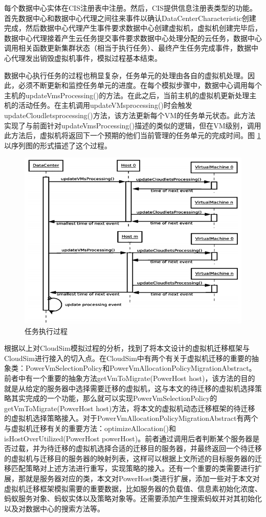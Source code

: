 每个数据中心实体在CIS注册表中注册。然后，CIS提供信息注册表类型的功能。首先数据中心和数据中心代理之间往来事件以确认DataCenterCharacteristic创建完成，然后数据中心代理产生事件要求数据中心创建虚拟机，虚拟机创建完毕后，数据中心代理接着产生云任务提交事件要求数据中心处理分配的云任务，数据中心调用相关函数更新集群状态（相当于执行任务）、最终产生任务完成事件，数据中心代理发出销毁虚拟机事件，模拟过程基本结束。

数据中心执行任务的过程也稍显复杂，任务单元的处理由各自的虚拟机处理。因此，必须不断更新和监控任务单元的进度。在每个模拟步骤中，数据中心调用每个主机的updateVmsProcessing()的方法。在此之后，当前主机的虚拟机更新处理主机的活动任务。在主机调用updateVMsprocessing()时会触发updateCloudletsprocessing()方法，该方法更新每个VM的任务单元状态。此方法实现了与前面针对updateVmsProcessing()描述的类似的逻辑，但在VM级别，调用此方法后，虚拟机将返回下一个预期的他们当前管理的任务单元的完成时间。图 \ref{Fig:chap4_3} 以序列图的形式描述了这个过程。

\begin{figure}[htb]
  \centering
  \includegraphics{./Figure/IMG_Chap4_3.png}
  \caption{任务执行过程}\label{Fig:chap4_3}
\end{figure}

根据以上对CloudSim模拟过程的分析，找到了将本文设计的虚拟机迁移框架与CloudSim进行接入的切入点。在CloudSim中有两个有关于虚拟机迁移的重要的抽象类：PowerVmSelectionPolicy和PowerVmAllocationPolicyMigrationAbstract。前者中有一个重要的抽象方法getVmToMigrate(PowerHost host)，该方法的目的就是从给定的服务器中选择需要迁移的虚拟机，这与本文的待迁移的虚拟机选择策略其实完成的一个功能，那么就可以实现PowerVmSelectionPolicy的getVmToMigrate(PowerHost host)方法，将本文的虚拟机动态迁移框架的待迁移的虚拟机选择策略接入。对于PowerVmAllocationPolicyMigrationAbstract有两个与虚拟机迁移有关的重要方法：optimizeAllocation()和 isHostOverUtilized(PowerHost powerHost)。前者通过调用后者判断某个服务器是否过载，并为待迁移的虚拟机选择合适的迁移目的服务器，并最终返回一个待迁移的虚拟机与迁移目的服务器的映射列表，这样可以根据上文所述的目标服务器的迁移匹配策略对上述方法进行重写，实现策略的接入。还有一个重要的类需要进行扩展，那就是服务器对应的类，本文对PowerHost类进行扩展，添加一些对于本文对虚拟机迁移框架模拟需要的重要数据，比如服务器的负载值、信息素初始化浓度、蚂蚁服务对象、蚂蚁实体以及策略对象等。还需要添加产生搜索蚂蚁并对其初始化以及对数据中心的搜索方法等。

